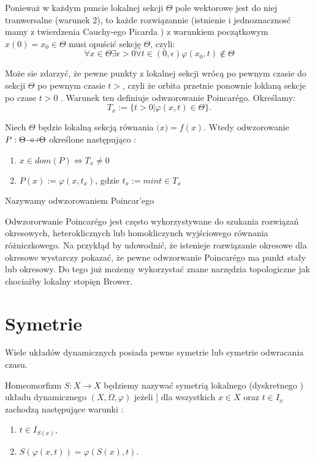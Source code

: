   Ponieważ w każdym puncie lokalnej sekcji $ \Theta $ pole wektorowe jest do niej tranwersalne (warunek 2), to każde 
  rozwiązannie (istnienie i jednoznacznosć mamy z twierdzenia Cauchy-ego Picarda ) z warunkiem początkowym 
  $ x(0) = x_0 \in \Theta $ musi opuścić sekcję $ \Theta $, czyli:
      $$
       \forall x \in \Theta \exists{\epsilon > 0} \forall t \in (0,\epsilon) \varphi(x_0,t) \notin \Theta 
      $$
 
  Może sie zdarzyć, że pewne punkty z lokalnej sekcji wrócą po pewnym czasie do sekcji $ \Theta $ po pewnym
  czasie $ t > $, czyli że orbita przetnie ponownie loklaną sekcje po czase $ t > 0 $ . Warunek ten definiuje odwzorowanie Poincar\'ego. Określamy:
  $$
    T_x := \{ t > 0 | \varphi(x,t) \in \Theta \}.
  $$

  \begin{definition} Niech $ \Theta $ będzie lokalną sekcją równania $ \dot(x) = f(x)$. Wtedy odwzorowanie 
    $ P: \Theta {\mathrel{\longrightarrow\mkern-25mu\circ}\;\;} \Theta $ określone następująco :
    \begin{enumerate}
     \item $ x \in dom(P) \Leftrightarrow T_x \neq 0 $
     \item $ P(x) := \varphi(x,t_x)$, gdzie $t_x := min{t \in T_x} $
    \end{enumerate}
    Nazywamy odwzorowaniem Poincar'ego

  \end{definition}
  
Odwzororwanie Poincar\'ego jest często wykorzystywane do szukania rozwiązań okresowych, heteroklicznych lub homokliczynch wyjściowego
równania różniczkowego. Na przykłąd by udowodnić, że istenieje rozwiązanie okresowe dla okresowe wystarczy pokazać, że pewne odwzorwanie 
Poincar\'ego ma punkt stały lub okresowy. Do tego już możemy wykorzystać znane narzędzia topologiczne jak chociażby lokalny stopięn Brower.


\section{Symetrie}

Wiele układów dynamicznych posiada pewne symetrie lub symetrie odwracania czasu.
\begin{definition}
  Homeomorfizm $ S : X \to X $ będziemy nazywać symetrią lokalnego (dyskretnego ) układu dynamicznego $(X,\Omega,\varphi) $ jeżeli ]
  dla wszystkich $ x \in X $ oraz $ t \in I_x $ zachodzą następujące warunki :
  \begin{enumerate}
   \item $ t \in I_{S(x)}$,
   \item $ S(\varphi(x,t)) = \varphi(S(x),t) $.
  \end{enumerate}

\end{definition}



